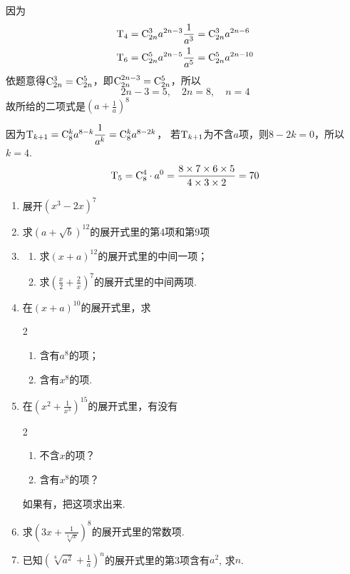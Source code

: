 \begin{solution}
因为
\[\begin{split}
    {\rm T}_4&={\rm C}^{3}_{2n}a^{2n-3}\dfrac{1}{a^3}={\rm C}^{3}_{2n}a^{2n-6}\\
    {\rm T}_6&={\rm C}^{5}_{2n}a^{2n-5}\dfrac{1}{a^5}={\rm C}^{5}_{2n}a^{2n-10}
\end{split}\]
依题意得${\rm C}^{3}_{2n}={\rm C}^{5}_{2n}$，即${\rm C}^{2n-3}_{2n}={\rm C}^{5}_{2n}$，所以
\[2n-3=5,\quad 2n=8,\quad n=4\]
故所给的二项式是$\left(a+\frac{1}{a}\right)^8$

因为${\rm T}_{k+1}={\rm C}^{k}_{8}a^{8-k}\dfrac{1}{a^k}={\rm C}^{k}_{8}a^{8-2k}$，
若${\rm T}_{k+1}$为不含$a$项，则$8-2k=0$，所以$k=4$.
\[{\rm T}_5={\rm C}^{4}_{8}\cdot a^0=\dfrac{8\times 7\times 6\times 5}{4\times 3\times 2}=70\]
\end{solution}

\begin{ex}
\begin{enumerate}
    \item 展开$(x^{3}-2x)^{7}$
    \item 求$(a+\sqrt{b})^{12}$的展开式里的第4项和第9项
    \item \begin{enumerate}[(1)]
        \item 求$(x+a)^{12}$的展开式里的中间一项；
        \item 求$\left(\frac x2+\frac2x\right)^7$的展开式里的中间两项.
    \end{enumerate}  
    \item 在$(x+a)^{10}$的展开式里，求
\begin{multicols}{2}
    \begin{enumerate}[(1)]
        \item 含有$a^{8}$的项；
        \item 含有$x^8$的项. 
    \end{enumerate}    
\end{multicols}

    \item 在$\left(x^{2}+\frac{1}{x^3}\right)^{15}$的展开式里，有没有
\begin{multicols}{2}
    \begin{enumerate}[(1)]
        \item 不含$x$的项？
        \item 含有$x^{8}$的项？
    \end{enumerate}
\end{multicols}
如果有，把这项求出来.
    
\item 求$\left(3x+\frac{1}{\sqrt[3]{x}}\right)^{8}$的展开式里的常数项. 
\item 已知$\left(\sqrt[8]{a^{2}}+\frac1a\right)^{n}$的展开式里的第3项含有$a^2$,    
    求$n$.
\end{enumerate}
\end{ex}

